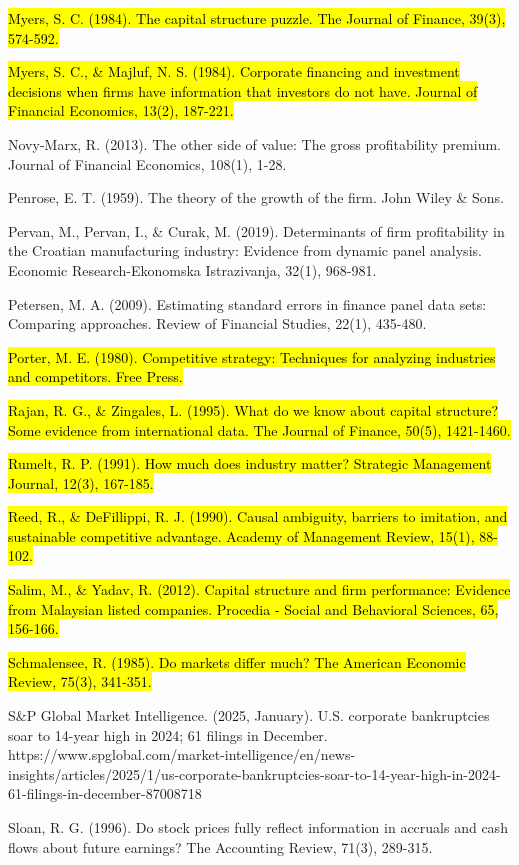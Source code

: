 \documentclass[12pt,a4paper]{article}
\begin{document}
\hl{Myers, S. C. (1984). The capital structure puzzle. The Journal of Finance, 39(3), 574-592.}

\hl{Myers, S. C., \& Majluf, N. S. (1984). Corporate financing and investment decisions when firms have information that investors do not have. Journal of Financial Economics, 13(2), 187-221.}

Novy-Marx, R. (2013). The other side of value: The gross profitability
premium. Journal of Financial Economics, 108(1), 1-28.

Penrose, E. T. (1959). The theory of the growth of the firm. John Wiley
\& Sons.

Pervan, M., Pervan, I., \& Curak, M. (2019). Determinants of firm
profitability in the Croatian manufacturing industry: Evidence from
dynamic panel analysis. Economic Research-Ekonomska Istrazivanja, 32(1),
968-981.

Petersen, M. A. (2009). Estimating standard errors in finance panel data
sets: Comparing approaches. Review of Financial Studies, 22(1), 435-480.

\hl{Porter, M. E. (1980). Competitive strategy: Techniques for analyzing industries and competitors. Free Press.}

\hl{Rajan, R. G., \& Zingales, L. (1995). What do we know about capital structure? Some evidence from international data. The Journal of Finance, 50(5), 1421-1460.}

\hl{Rumelt, R. P. (1991). How much does industry matter? Strategic Management Journal, 12(3), 167-185.}

\hl{Reed, R., \& DeFillippi, R. J. (1990). Causal ambiguity, barriers to imitation, and sustainable competitive advantage. Academy of Management Review, 15(1), 88-102.}

\hl{Salim, M., \& Yadav, R. (2012). Capital structure and firm performance: Evidence from Malaysian listed companies. Procedia - Social and Behavioral Sciences, 65, 156-166.}

\hl{Schmalensee, R. (1985). Do markets differ much? The American Economic Review, 75(3), 341-351.}

S\&P Global Market Intelligence. (2025, January). U.S. corporate
bankruptcies soar to 14-year high in 2024; 61 filings in December.
https://www.spglobal.com/market-intelligence/en/news-insights/articles/2025/1/us-corporate-bankruptcies-soar-to-14-year-high-in-2024-61-filings-in-december-87008718

Sloan, R. G. (1996). Do stock prices fully reflect information in
accruals and cash flows about future earnings? The Accounting Review,
71(3), 289-315.
\end{document}
